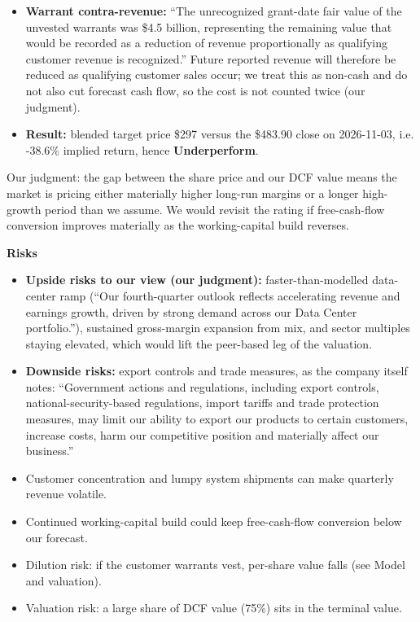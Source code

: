 \documentclass[a4paper,10pt]{article}
\begin{document}
\begin{itemize}
\item \textbf{Warrant contra-revenue:} “The unrecognized grant-date fair value of the unvested warrants was \$4.5 billion, representing the remaining value that would be recorded as a reduction of revenue proportionally as qualifying customer revenue is recognized.” Future reported revenue will therefore be reduced as qualifying customer sales occur; we treat this as non-cash and do not also cut forecast cash flow, so the cost is not counted twice (our judgment).
\item \textbf{Result:} blended target price \$297 versus the \$483.90 close on 2026-11-03, i.e. -38.6\% implied return, hence \textbf{Underperform}.
\end{itemize}

Our judgment: the gap between the share price and our DCF value means the market is pricing either materially higher long-run margins or a longer high-growth period than we assume. We would revisit the rating if free-cash-flow conversion improves materially as the working-capital build reverses.

\par\smallskip\textbf{\color{MemoBlue}Risks}\par

\begin{itemize}\setlength{\itemsep}{1pt}
\item \textbf{Upside risks to our view (our judgment):} faster-than-modelled data-center ramp (“Our fourth-quarter outlook reflects accelerating revenue and earnings growth, driven by strong demand across our Data Center portfolio.”), sustained gross-margin expansion from mix, and sector multiples staying elevated, which would lift the peer-based leg of the valuation.
\item \textbf{Downside risks:} export controls and trade measures, as the company itself notes: “Government actions and regulations, including export controls, national-security-based regulations, import tariffs and trade protection measures, may limit our ability to export our products to certain customers, increase costs, harm our competitive position and materially affect our business.”
\item Customer concentration and lumpy system shipments can make quarterly revenue volatile.
\item Continued working-capital build could keep free-cash-flow conversion below our forecast.
\item Dilution risk: if the customer warrants vest, per-share value falls (see Model and valuation).
\item Valuation risk: a large share of DCF value (75\%) sits in the terminal value.
\end{itemize}
\end{document}
